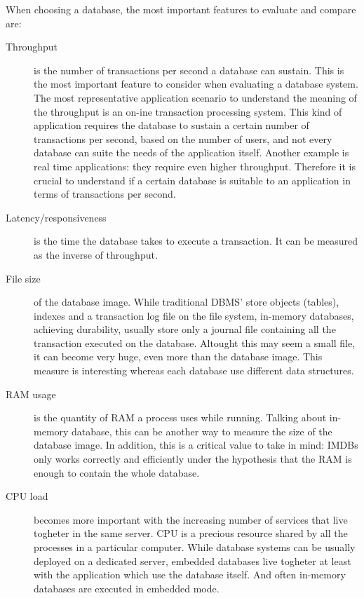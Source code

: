 When choosing a database, the most important features to evaluate and compare are:

\begin{description}

	\item[Throughput] is the number of transactions per second a database can sustain. This is the most important feature to consider when evaluating a database system. The most representative application scenario to understand the meaning of the throughput is an on-ine transaction processing system. This kind of application requires the database to sustain a certain number of transactions per second, based on the number of users, and not every database can suite the needs of the application itself. Another example is real time applications: they require even higher throughput. Therefore it is crucial to understand if a certain database is suitable to an application in terms of transactions per second.
	
	\item[Latency/responsiveness] is the time the database takes to execute a transaction. It can be measured as the inverse of throughput.
	
	\item[File size] of the database image. While traditional DBMS' store objects (tables), indexes and a transaction log file on the file system, in-memory databases, achieving durability, usually store only a journal file containing all the transaction executed on the database. Altought this may seem a small file, it can become very huge, even more than the database image. This measure is interesting whereas each database use different data structures.
	
	\item[RAM usage] is the quantity of RAM a process uses while running. Talking about in-memory database, this can be another way to measure the size of the database image. In addition, this is a critical value to take in mind: IMDBs only works correctly and efficiently under the hypothesis that the RAM is enough to contain the whole database.
	
	\item[CPU load] becomes more important with the increasing number of services that live togheter in the same server. CPU is a precious resource shared by all the processes in a particular computer. While database systems can be usually deployed on a dedicated server, embedded databases live togheter at least with the application which use the database itself. And often in-memory databases are executed in embedded mode.
	

\end{description}
